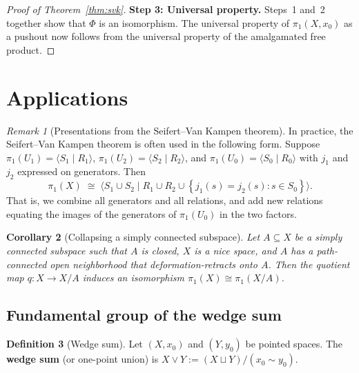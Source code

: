 \documentclass[12pt,a4paper,openany]{book}
\theoremstyle{definition}
\newtheorem{definition}{Definition}[chapter]
\theoremstyle{plain}
\newtheorem{corollary}[definition]{Corollary}
\theoremstyle{remark}
\newtheorem{remark}[definition]{Remark}
\newcommand{\set}[1]{\left\{#1\right\}}
\begin{document}
\begin{proof}[Proof of Theorem~\ref{thm:svk}]
  \medskip
  \noindent\textbf{Step 3: Universal property.}
  Steps~1 and~2 together show that $\Phi$ is an isomorphism.  The universal
  property of $\pi_1(X, x_0)$ as a pushout now follows from the universal
  property of the amalgamated free product.
\end{proof}

\section{Applications}\label{sec:svk-applications}

\begin{remark}[Presentations from the Seifert--Van Kampen theorem]\label{rem:svk-presentations}
  In practice, the Seifert--Van Kampen theorem is often used in the following
  form.  Suppose $\pi_1(U_1) = \langle S_1 \mid R_1 \rangle$,
  $\pi_1(U_2) = \langle S_2 \mid R_2 \rangle$, and
  $\pi_1(U_0) = \langle S_0 \mid R_0 \rangle$ with $j_1$ and $j_2$
  expressed on generators.  Then
  \[
    \pi_1(X) \;\cong\; \langle S_1 \cup S_2 \mid R_1 \cup R_2 \cup
      \set{j_1(s) = j_2(s) : s \in S_0} \rangle.
  \]
  That is, we combine all generators and all relations, and add new relations
  equating the images of the generators of $\pi_1(U_0)$ in the two factors.
\end{remark}

\begin{corollary}[Collapsing a simply connected subspace]\label{cor:svk-collapse}
  Let $A \subseteq X$ be a simply connected subspace such that $A$ is
  closed, $X$ is a nice space, and $A$ has a path-connected open neighborhood
  that deformation-retracts onto $A$.  Then the quotient map
  $q\colon X \to X/A$ induces an isomorphism $\pi_1(X) \cong \pi_1(X/A)$.
\end{corollary}

\subsection{Fundamental group of the wedge sum}\label{subsec:wedge-sum}

\begin{definition}[Wedge sum]\label{def:wedge-sum}
  Let $(X, x_0)$ and $(Y, y_0)$ be pointed spaces.  The \textbf{wedge sum}
  (or one-point union) is
  $X \vee Y := (X \sqcup Y) / (x_0 \sim y_0)$.
\end{definition}

\begin{center}
\end{center}
\end{document}

